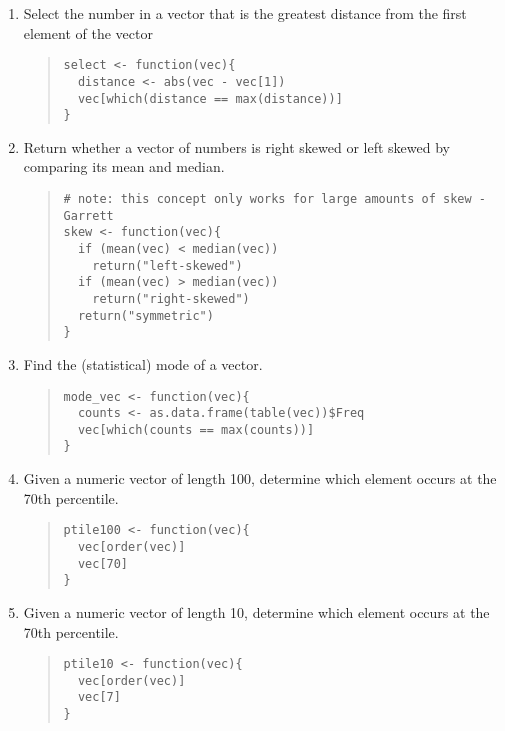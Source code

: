 \documentclass{article}
\begin{document}
\begin{enumerate}
\item Select the number in a vector that is the greatest distance from the first element of the vector
  \begin{quote}
    \begin{verbatim}
select <- function(vec){
  distance <- abs(vec - vec[1])
  vec[which(distance == max(distance))]
}
    \end{verbatim}
  \end{quote}

\item Return whether a vector of numbers is right skewed or left skewed by comparing its mean and median.
  \begin{quote}
    \begin{verbatim}
# note: this concept only works for large amounts of skew - Garrett
skew <- function(vec){
  if (mean(vec) < median(vec))
    return("left-skewed")
  if (mean(vec) > median(vec))
    return("right-skewed")
  return("symmetric")
}
    \end{verbatim}
  \end{quote}

\item Find the (statistical) mode of a vector.
  \begin{quote}
    \begin{verbatim}
mode_vec <- function(vec){
  counts <- as.data.frame(table(vec))$Freq
  vec[which(counts == max(counts))]
}
    \end{verbatim}
  \end{quote}

\item Given a numeric vector of length 100, determine which element occurs at the 70th percentile.
  \begin{quote}
    \begin{verbatim}
ptile100 <- function(vec){
  vec[order(vec)]
  vec[70]
}

    \end{verbatim}
  \end{quote}

\item Given a numeric vector of length 10, determine which element occurs at the 70th percentile.
  \begin{quote}
    \begin{verbatim}
ptile10 <- function(vec){
  vec[order(vec)]
  vec[7]
}

    \end{verbatim}
  \end{quote}


\end{enumerate}
\end{document}
